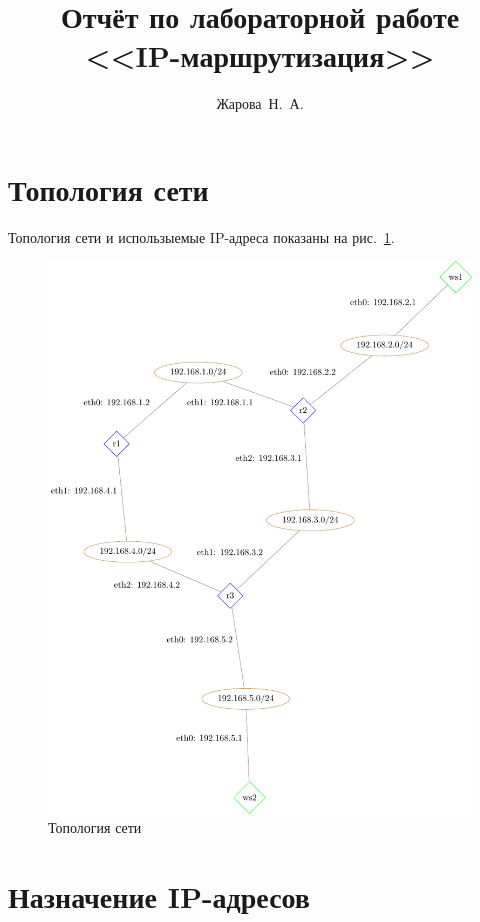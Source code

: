 \documentclass[a4paper,12pt]{article}
\title{Отчёт по лабораторной работе \\ <<IP-маршрутизация>>}
\author{Жарова~Н.~А.}
\begin{document}
\maketitle

\tableofcontents


\section{Топология сети}

Топология сети и использыемые IP-адреса показаны на рис.~\ref{fig:network}.

\begin{figure}
\centering
\includegraphics[width=\textwidth]{includes/network_gv.pdf}
\caption{Топология сети}
\label{fig:network}
\end{figure}


\section{Назначение IP-адресов}
\end{document}
